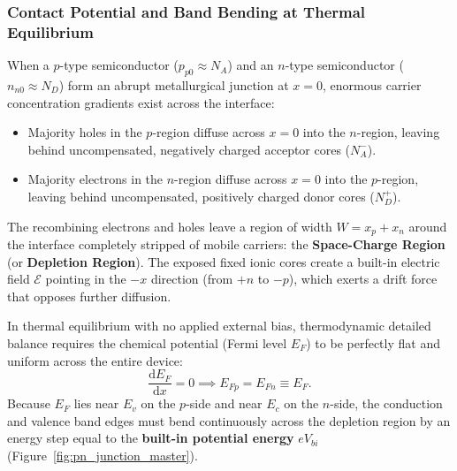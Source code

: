 \documentclass[11pt,a4paper]{article}
\newcommand{\dv}[2]{\frac{\mathrm{d}#1}{\mathrm{d}#2}}
\begin{document}
\subsubsection{Contact Potential and Band Bending at Thermal Equilibrium}
When a $p$-type semiconductor ($p_{p0} \approx N_A$) and an $n$-type semiconductor ($n_{n0} \approx N_D$) form an abrupt metallurgical junction at $x=0$, enormous carrier concentration gradients exist across the interface:
\begin{itemize}[noitemsep]
    \item Majority holes in the $p$-region diffuse across $x=0$ into the $n$-region, leaving behind uncompensated, negatively charged acceptor cores ($N_A^-$).
    \item Majority electrons in the $n$-region diffuse across $x=0$ into the $p$-region, leaving behind uncompensated, positively charged donor cores ($N_D^+$).
\end{itemize}
The recombining electrons and holes leave a region of width $W = x_p + x_n$ around the interface completely stripped of mobile carriers: the \textbf{Space-Charge Region} (or \textbf{Depletion Region}).
The exposed fixed ionic cores create a built-in electric field $\bm{\mathcal{E}}$ pointing in the $-x$ direction (from $+n$ to $-p$), which exerts a drift force that opposes further diffusion.

In thermal equilibrium with no applied external bias, thermodynamic detailed balance requires the chemical potential (Fermi level $E_F$) to be perfectly flat and uniform across the entire device:
\begin{equation}
    \dv{E_F}{x} = 0 \implies E_{Fp} = E_{Fn} \equiv E_F.
\end{equation}
Because $E_F$ lies near $E_v$ on the $p$-side and near $E_c$ on the $n$-side, the conduction and valence band edges must bend continuously across the depletion region by an energy step equal to the \textbf{built-in potential energy} $e V_{bi}$ (Figure~\ref{fig:pn_junction_master}).
\end{document}

